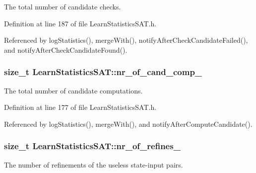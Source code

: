 The total number of candidate checks. 



Definition at line 187 of file Learn\-Statistics\-S\-A\-T.\-h.



Referenced by log\-Statistics(), merge\-With(), notify\-After\-Check\-Candidate\-Failed(), and notify\-After\-Check\-Candidate\-Found().

\hypertarget{classLearnStatisticsSAT_a02de895c31e4c58396d5f07154e21561}{
\subsubsection[{nr\-\_\-of\-\_\-cand\-\_\-comp\-\_\-}]{\setlength{\rightskip}{0pt plus 5cm}size\-\_\-t Learn\-Statistics\-S\-A\-T\-::nr\-\_\-of\-\_\-cand\-\_\-comp\-\_\-\hspace{0.3cm}{\ttfamily [protected]}}}\label{classLearnStatisticsSAT_a02de895c31e4c58396d5f07154e21561}


The total number of candidate computations. 



Definition at line 177 of file Learn\-Statistics\-S\-A\-T.\-h.



Referenced by log\-Statistics(), merge\-With(), and notify\-After\-Compute\-Candidate().

\hypertarget{classLearnStatisticsSAT_afa9b3c4bb24e7f6ebd9593dfb916c11e}{
\subsubsection[{nr\-\_\-of\-\_\-refines\-\_\-}]{\setlength{\rightskip}{0pt plus 5cm}size\-\_\-t Learn\-Statistics\-S\-A\-T\-::nr\-\_\-of\-\_\-refines\-\_\-\hspace{0.3cm}{\ttfamily [protected]}}}\label{classLearnStatisticsSAT_afa9b3c4bb24e7f6ebd9593dfb916c11e}


The number of refinements of the useless state-\/input pairs. 




